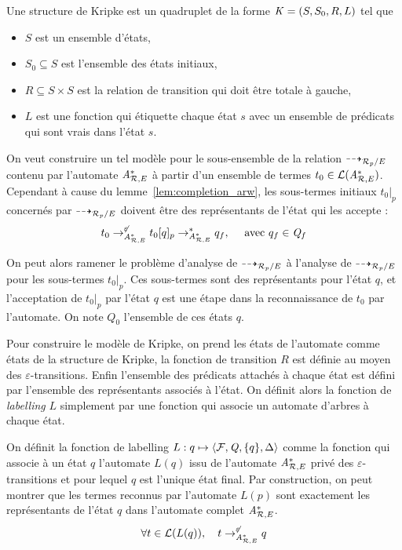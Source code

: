 \begin{definition}
Une structure de Kripke est un quadruplet de la forme $\mathit K = (S, S_0, R, L)$ tel que
\begin{itemize}
\item $S$ est un ensemble d'états,
\item $S_0 \subseteq S$ est l'ensemble des états initiaux,
\item $R \subseteq S \times S$ est la relation de transition qui doit être totale à gauche,
\item $L$ est une fonction qui étiquette chaque état $s$ avec un ensemble de prédicats qui sont vrais 
  dans l'état $s$.
\end{itemize}
\end{definition}

On veut construire un tel modèle pour le sous-ensemble de la relation $\dashrightarrow_{\mathcal R_p/E}$ contenu par l'automate ${\mathit A}_{\mathcal R,E}^*$
à partir d'un ensemble de termes $t_0 \in \mathcal{L}({\mathit A}_{\mathcal R,E}^*)$. Cependant à cause du lemme~\ref{lem:completion_arw}, les sous-termes
initiaux $t_0|_p$  concernés par $\dashrightarrow_{\mathcal R_p/E}$ doivent être des représentants de l'état qui les accepte :
\begin{equation*}
  \label{eq:1}
  t_0 \rightarrow^{\not\varepsilon}_{{\mathit A}_{\mathcal R,E}^*} t_0[q]_p \rightarrow_{{\mathit A}_{\mathcal R,E}^*}^* q_f,\quad \textrm{ avec } q_f \in \mathit Q_f
\end{equation*}

On peut alors ramener le problème d'analyse de $\dashrightarrow_{\mathcal R_p/E}$ à l'analyse de $\dashrightarrow_{\mathcal R_p/E}$ pour les sous-termes $t_0|_p$.
Ces sous-termes sont des représentants pour l'état $q$, et l'acceptation de $t_0|_p$ par l'état $q$ est une étape dans la
reconnaissance de $t_0$ par l'automate. On note $Q_0$ l'ensemble de ces états $q$.

Pour construire le modèle de Kripke, on prend les états de l'automate comme états de la structure de Kripke, 
la fonction de transition $R$ est définie au moyen des $\varepsilon$-transitions.
Enfin l'ensemble des prédicats attachés à  chaque état est défini par l'ensemble des représentants associés à l'état. 
On définit alors la fonction de \textit{labelling} $L$ simplement par une fonction qui associe un automate d'arbres à chaque état.

\begin{definition}
  On définit la fonction de labelling $L : q \mapsto \langle \mathcal{F}, \mathit Q, \{q\}, \Delta\rangle$ comme la fonction
  qui associe à un état $q$ l'automate $L(q)$ issu de l'automate ${\mathit A}_{\mathcal R,E}^*$ privé des $\varepsilon$-transitions
  et pour lequel $q$ est l'unique état final.
  Par construction, on peut montrer que les termes reconnus par l'automate $L(p)$ sont exactement les représentants
  de l'état $q$ dans l'automate complet ${\mathit A}_{\mathcal R,E}^*$.
  \[\forall t \in \mathcal{L}(L(q)), \quad t \rightarrow^{\not\varepsilon}_{{\mathit A}_{\mathcal R,E}^*} q\]
\end{definition}

